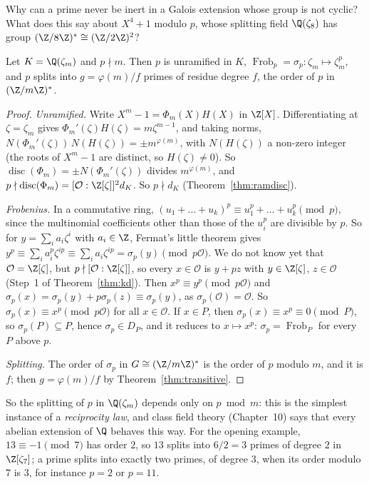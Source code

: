 \begin{think}
Why can a prime never be inert in a Galois extension whose group is not cyclic? What does this say about $X^4+1$
modulo $p$, whose splitting field $\Q(\zeta_8)$ has group $(\Z/8\Z)^*\cong(\Z/2\Z)^2$?
\end{think}

\begin{theorem}\label{thm:cyclosplit}
Let $K=\Q(\zeta_m)$ and $p\nmid m$. Then $p$ is unramified in $K$, $\operatorname{Frob}_p=\sigma_p:\zeta_m\mapsto
\zeta_m^p$, and $p$ splits into $g=\varphi(m)/f$ primes of residue degree $f$, the order of $p$ in $(\Z/m\Z)^*$.
\end{theorem}
\begin{proof}
\emph{Unramified.} Write $X^m-1=\Phi_m(X)H(X)$ in $\Z[X]$. Differentiating at $\zeta=\zeta_m$ gives
$\Phi_m'(\zeta)H(\zeta)=m\zeta^{m-1}$, and taking norms, $N(\Phi_m'(\zeta))\,N(H(\zeta))=\pm m^{\varphi(m)}$, with
$N(H(\zeta))$ a non-zero integer (the roots of $X^m-1$ are distinct, so $H(\zeta)\ne0$). So
$\operatorname{disc}(\Phi_m)=\pm N(\Phi_m'(\zeta))$ divides $m^{\varphi(m)}$, and $p\nmid\operatorname{disc}(\Phi_m)=
[\mathcal O:\Z[\zeta]]^2d_K$. So $p\nmid d_K$ (Theorem~\ref{thm:ramdisc}).

\emph{Frobenius.} In a commutative ring, $(u_1+\dots+u_k)^p\equiv u_1^p+\dots+u_k^p\pmod p$, since the multinomial
coefficients other than those of the $u_i^p$ are divisible by $p$. So for $y=\sum_ia_i\zeta^i$ with $a_i\in\Z$, Fermat's
little theorem gives $y^p\equiv\sum_ia_i^p\zeta^{ip}\equiv\sum_ia_i\zeta^{ip}=\sigma_p(y)\pmod{p\mathcal O}$. We do not
know yet that $\mathcal O=\Z[\zeta]$, but $p\nmid[\mathcal O:\Z[\zeta]]$, so every $x\in\mathcal O$ is $y+pz$ with
$y\in\Z[\zeta]$, $z\in\mathcal O$ (Step~1 of Theorem~\ref{thm:kd}). Then $x^p\equiv y^p\pmod{p\mathcal O}$ and
$\sigma_p(x)=\sigma_p(y)+p\sigma_p(z)\equiv\sigma_p(y)$, as $\sigma_p(\mathcal O)=\mathcal O$. So $\sigma_p(x)\equiv x^p
\pmod{p\mathcal O}$ for all $x\in\mathcal O$. If $x\in P$,
then $\sigma_p(x)\equiv x^p\equiv0\pmod P$, so $\sigma_p(P)\subseteq P$, hence $\sigma_p\in D_P$, and it reduces to
$x\mapsto x^p$: $\sigma_p=\operatorname{Frob}_P$ for every $P$ above $p$.

\emph{Splitting.} The order of $\sigma_p$ in $G\cong(\Z/m\Z)^*$ is the order of $p$ modulo $m$, and it is $f$; then
$g=\varphi(m)/f$ by Theorem~\ref{thm:transitive}.
\end{proof}

So the splitting of $p$ in $\Q(\zeta_m)$ depends only on $p\bmod m$: this is the simplest instance of a \emph{reciprocity
law}, and class field theory (Chapter~10) says that every abelian extension of $\Q$ behaves this way. For the opening
example, $13\equiv-1\pmod 7$ has order $2$, so $13$ splits into $6/2=3$ primes of degree $2$ in $\Z[\zeta_7]$; a prime
splits into exactly two primes, of degree $3$, when its order modulo $7$ is $3$, for instance $p=2$ or $p=11$.


